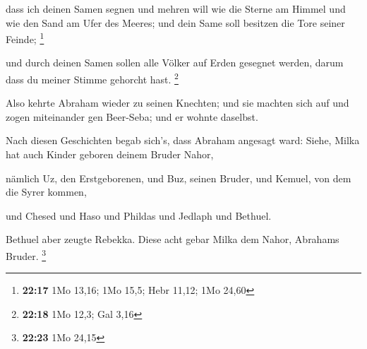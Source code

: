  dass ich deinen Samen segnen und mehren will wie die
Sterne am Himmel und wie den Sand am Ufer des Meeres; und dein Same soll
besitzen die Tore seiner Feinde; \footnote{\textbf{22:17} 1Mo 13,16; 1Mo
  15,5; Hebr 11,12; 1Mo 24,60}

 und durch deinen Samen sollen alle Völker auf Erden
gesegnet werden, darum dass du meiner Stimme gehorcht hast. \footnote{\textbf{22:18}
  1Mo 12,3; Gal 3,16}

 Also kehrte Abraham wieder zu seinen Knechten; und sie
machten sich auf und zogen miteinander gen Beer-Seba; und er wohnte
daselbst.

 Nach diesen Geschichten begab sich's, dass Abraham
angesagt ward: Siehe, Milka hat auch Kinder geboren deinem Bruder Nahor,

 nämlich Uz, den Erstgeborenen, und Buz, seinen Bruder, und
Kemuel, von dem die Syrer kommen,

 und Chesed und Haso und Phildas und Jedlaph und Bethuel.

 Bethuel aber zeugte Rebekka. Diese acht gebar Milka dem
Nahor, Abrahams Bruder. \footnote{\textbf{22:23} 1Mo 24,15}

